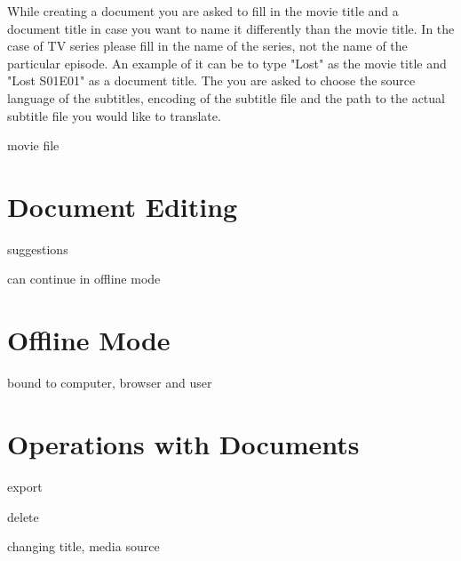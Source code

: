 While creating a document you are asked to fill in the movie title and a document title in case you want to name it differently than the movie title. In the case of TV series please fill in the name of the series, not the name of the particular episode. An example of it can be to type "Lost" as the movie title and "Lost S01E01" as a document title. The you are asked to choose the source language of the subtitles, encoding of the subtitle file and the path to the actual subtitle file you would like to translate.


movie file

\section{Document Editing}

suggestions

can continue in offline mode

\section{Offline Mode}

bound to computer, browser and user

\section{Operations with Documents}

export

delete

changing title, media source